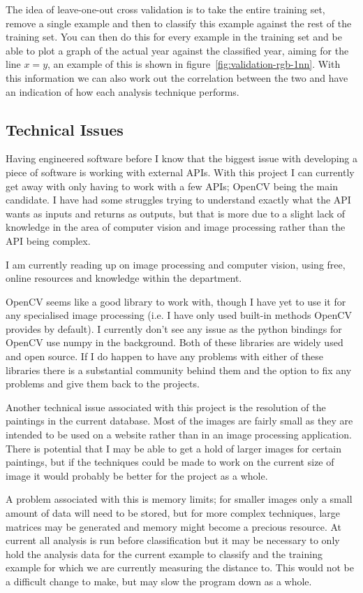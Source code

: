 \documentclass[11pt,fleqn,twoside]{article}
\begin{document}
The idea of leave-one-out cross validation is to take the entire training set, remove a single 
example and then to classify this example against the rest of the training set. You can then do
this for every example in the training set and be able to plot a graph of the actual year against
the classified year, aiming for the line $x=y$, an example of this is shown in 
figure~\ref{fig:validation-rgb-1nn}. With this information we can also work out the correlation 
between the two and have an indication of how each analysis technique performs.


\subsection{Technical Issues}
Having engineered software before I know that the biggest issue with developing a piece of software
is working with external APIs. With this project I can currently get away with only having to work
with a few APIs; OpenCV being the main candidate. I have had some struggles trying to understand
exactly what the API wants as inputs and returns as outputs, but that is more due to a slight lack
of knowledge in the area of computer vision and image processing rather than the API being complex.

I am currently reading up on image processing and computer vision, using free,
online resources\cite{Prince2012Computer} and knowledge within the department.

OpenCV seems like a good library to work with, though I have yet to use it for any
specialised image processing (i.e. I have only used built-in methods OpenCV provides by default).
I currently don't see any issue as the python bindings for OpenCV use numpy in the background. Both
of these libraries are widely used and open source. If I do happen to have any problems with either
of these libraries there is a substantial community behind them and the option to fix any problems
and give them back to the projects.

Another technical issue associated with this project is the resolution of the paintings in the 
current database. Most of the images are fairly small as they are intended to be used on a website
rather than in an image processing application. There is potential that I may be able to get a hold
of larger images for certain paintings, but if the techniques could be made to work on the current
size of image it would probably be better for the project as a whole.

A problem associated with this is memory limits; for smaller images only a small amount of data
will need to be stored, but for more complex techniques, large matrices may be generated and memory
might become a precious resource. At current all analysis is run before classification but it may
be necessary to only hold the analysis data for the current example to classify and the training 
example for which we are currently measuring the distance to. This would not be a difficult change
to make, but may slow the program down as a whole.
\end{document}

